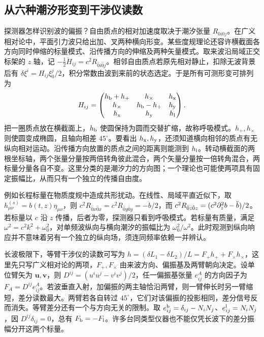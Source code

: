 \subsection{从六种潮汐形变到干涉仪读数}

探测器怎样识别波的偏振？自由质点的相对加速度取决于潮汐张量 $R_{0i0j}$。在广义相对论中，平面引力波只给出加、叉两种横向形变。某些度规理论还容许横截面各方向同时伸缩的标量模式、沿传播方向的伸缩及两种矢量模式。取来波沿局域正交标架的 $z$ 轴，记 $-\tfrac12\ddot H_{ij}=c^2 R_{\hat0 i\hat0 j}$。相邻自由质点若原先相对静止，扣除无波背景后有 $\delta\xi^i=H_{ij}\xi_0^j/2$，积分常数由波到来前的状态选定。于是所有可测形变可排列为
\[
 H_{ij}=
 \begin{pmatrix}
 h_{\rm b}+h_+&h_\times&h_{\rm x}\\
 h_\times&h_{\rm b}-h_+&h_{\rm y}\\
 h_{\rm x}&h_{\rm y}&h_{\rm l}
 \end{pmatrix}.
\]
把一圈质点放在横截面上，$h_{\rm b}$ 使圆保持为圆而交替扩缩，故称呼吸模式。$h_+,h_\times$ 则使圆变成椭圆，且轴向相差 $45^\circ$。要看出 $h_{\rm x},h_{\rm y}$，还须知道横向相邻的质点有无纵向相对运动。沿传播方向放置的质点之间的距离则能测到 $h_{\rm l}$。转动横截面的两根坐标轴，两个张量分量按两倍转角彼此混合，两个矢量分量按一倍转角混合，两标量分量各自不变。这里分类的是潮汐力的方向图；一个理论也可能使两项具有固定振幅比，从而只有一个独立的传播自由度。

例如长程标量在物质度规中造成共形扰动。在线性、局域平直近似下，取 $h_{\mu\nu}^{(s)}=b(t,z)\eta_{\mu\nu}$，则 $c^2 R_{\hat0 x\hat0 x}=c^2 R_{\hat0 y\hat0 y}=-\ddot b/2$，而 $c^2 R_{\hat0 z\hat0 z}=(c^2\partial_z^2 b-\ddot b)/2$。若标量以 $c$ 沿 $z$ 传播，后者为零，探测器只看到呼吸模式。若标量有质量，满足 $\omega^2=c^2 k^2+\omega_0^2$，对单频波纵向与横向潮汐的振幅比为 $\omega_0^2/\omega^2$。此时观测到纵向响应并不意味着另有一个独立的纵向场，须连同频率依赖一并辨认。

长波极限下，等臂干涉仪的读数可写为 $h=(\delta L_1-\delta L_2)/L=F_+h_++F_\times h_\times$，这里先只写广义相对论的两项，$F_+,F_\times$ 由来波方向、偏振基及两臂朝向决定。设单位臂矢为 $\bm u,\bm v$，则 $D^{ij}=(u^iu^j-v^iv^j)/2$，任一偏振基张量 $e^A_{ij}$ 的方向因子为 $F_A=D^{ij}e^A_{ij}$。若波垂直入射，加偏振的两主轴恰沿两臂，则一臂伸长时另一臂缩短，差分读数最大。两臂若各自转过 $45^\circ$，它们对该偏振的投影相同，差分信号反而消失。等臂差分还有一个与方向无关的限制。取 $e^{\rm b}_{ij}=\delta_{ij}-N_iN_j$、$e^{\rm l}_{ij}=N_iN_j$，因 $D^{ij}\delta_{ij}=0$，总有 $F_{\rm b}=-F_{\rm l}$。许多台同类型仪器也不能仅凭长波下的差分振幅分开这两个标量。

